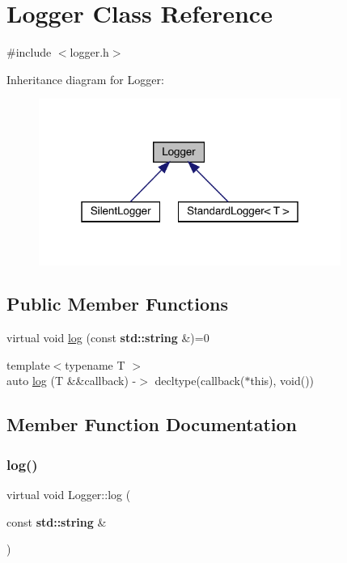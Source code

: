 \hypertarget{class_logger}{}\section{Logger Class Reference}
\label{class_logger}


{\ttfamily \#include $<$logger.\+h$>$}



Inheritance diagram for Logger\+:
\nopagebreak
\begin{figure}[H]
\begin{center}
\leavevmode
\includegraphics[width=280pt]{class_logger__inherit__graph}
\end{center}
\end{figure}
\subsection*{Public Member Functions}
\begin{DoxyCompactItemize}
\item 
virtual void \hyperlink{class_logger_a20f6e95efb1eab08269484d8745feb65}{log} (const \textbf{ std\+::string} \&)=0
\item 
{\footnotesize template$<$typename T $>$ }\\auto \hyperlink{class_logger_a7ea8858bb20cc869f5e6644c682292d7}{log} (T \&\&callback) -\/$>$ decltype(callback($\ast$this), void())
\end{DoxyCompactItemize}


\subsection{Member Function Documentation}
\mbox{\label{class_logger_a20f6e95efb1eab08269484d8745feb65}} 
\subsubsection{\texorpdfstring{log()}{log()}\hspace{0.1cm}{\footnotesize\ttfamily [1/2]}}
{\footnotesize\ttfamily virtual void Logger\+::log (\begin{DoxyParamCaption}\item[{const \textbf{ std\+::string} \&}]{ }\end{DoxyParamCaption})\hspace{0.3cm}{\ttfamily [pure virtual]}}



